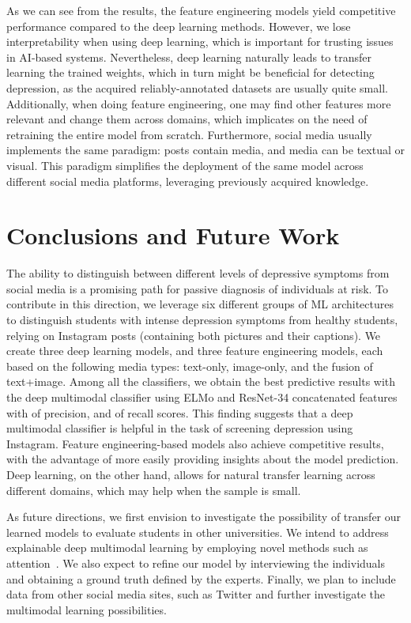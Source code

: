 \documentclass[letterpaper]{article} \usepackage{aaai20}  \usepackage{times}  \usepackage{helvet} \usepackage{courier}  \usepackage[hyphens]{url}  \usepackage{graphicx} \urlstyle{rm} \def\UrlFont{\rm}  \usepackage{graphicx}  \frenchspacing  \setlength{\pdfpagewidth}{8.5in}  \setlength{\pdfpageheight}{11in}  \usepackage[final]{changes}
\begin{document}
As we can see from the results, the feature engineering models yield competitive performance compared to the deep learning methods. However, we lose interpretability when using deep learning, which is important for trusting issues in AI-based systems. Nevertheless, deep learning naturally leads to transfer learning the trained weights, which in turn might be beneficial for detecting depression, as the acquired reliably-annotated datasets are usually quite small. Additionally, when doing feature engineering, one may find other features more relevant and change them across domains, which implicates on the need of retraining the entire model from scratch. Furthermore, social media usually implements the same paradigm: posts contain media, and media can be textual or visual. This paradigm simplifies the deployment of the same model across different social media platforms, leveraging previously acquired knowledge.

\section{Conclusions and Future Work}\label{sec:concl}

The ability to distinguish between different levels of depressive symptoms from social media is a promising path for passive diagnosis of individuals at risk. To contribute in this direction, we leverage six different groups of ML architectures to distinguish students with intense depression symptoms from healthy students, relying on Instagram posts (containing both pictures and their captions). We create three deep learning models, and three feature engineering models, each based on the following media types: text-only, image-only, and the fusion of text+image. Among all the classifiers, we obtain the best predictive results with the deep multimodal classifier using ELMo and ResNet-34 concatenated features with  of precision, and  of recall scores. This finding suggests that a deep multimodal classifier is helpful in the task of screening depression using Instagram. Feature engineering-based models also achieve competitive results, with the advantage of more easily providing insights about the model prediction. Deep learning, on the other hand, allows for natural transfer learning across different domains, which may help when the sample is small.

As future directions, we first envision to investigate the possibility of transfer our learned models to evaluate students in other universities. We intend to address explainable deep multimodal learning by employing novel methods such as attention~\cite{vaswani2017attention}. We also expect to refine our model by interviewing the individuals and obtaining a ground truth defined by the experts. Finally, we plan to include data from other social media sites, such as Twitter and further investigate the multimodal learning possibilities.
\end{document}
